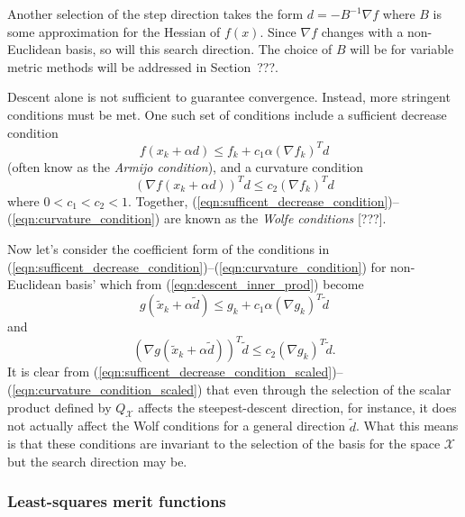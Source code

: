 Another selection of the step direction takes the form $d = - B^{-1} {}\nabla
f$ where $B$ is some approximation for the Hessian of $f(x)$.  Since ${}\nabla
f$ changes with a non-Euclidean basis, so will this search direction.  The
choice of $B$ will be for variable metric methods will be addressed in
Section~???.

Descent alone is not sufficient to guarantee convergence.  Instead, more
stringent conditions must be met.  One such set of conditions include a
sufficient decrease condition
%
\begin{equation}
f(x_k + \alpha d) \le f_k + c_1 \alpha (\nabla f_k)^T d
\label{eqn:sufficent_decrease_condition}
\end{equation}
%
(often know as the {}\textit{Armijo condition}), and a curvature condition
%
\begin{equation}
(\nabla f(x_k + \alpha d))^T d \le c_2 (\nabla f_k)^T d
\label{eqn:curvature_condition}
\end{equation}
%
where $0 < c_1 < c_2 < 1$.  Together,
(\ref{eqn:sufficent_decrease_condition})--(\ref{eqn:curvature_condition}) are
known as the {}\textit{Wolfe conditions} [???].

Now let's consider the coefficient form of the conditions in
(\ref{eqn:sufficent_decrease_condition})--(\ref{eqn:curvature_condition}) for
non-Euclidean basis' which from (\ref{eqn:descent_inner_prod}) become
%
\begin{equation}
g(\tilde{x}_k + \alpha \tilde{d}) \le g_k + c_1 \alpha (\nabla g_k)^T \tilde{d}
\label{eqn:sufficent_decrease_condition_scaled}
\end{equation}
%
and
%
\begin{equation}
(\nabla g(\tilde{x}_k + \alpha \tilde{d}))^T \tilde{d} \le c_2 (\nabla g_k)^T \tilde{d}.
\label{eqn:curvature_condition_scaled}
\end{equation}
%
It is clear from
(\ref{eqn:sufficent_decrease_condition_scaled})--(\ref{eqn:curvature_condition_scaled})
that even through the selection of the scalar product defined by
$Q_{\mathcal{X}}$ affects the steepest-descent direction, for instance, it
does not actually affect the Wolf conditions for a general direction
$\tilde{d}$.  What this means is that these conditions are invariant to the
selection of the basis for the space $\mathcal{X}$ but the search direction
may be.

\subsubsection{Least-squares merit functions}

